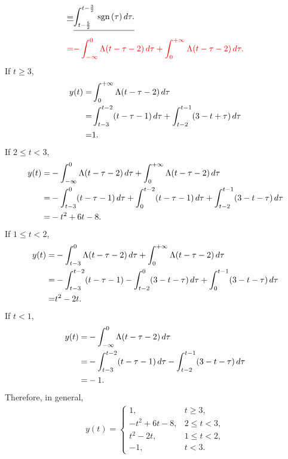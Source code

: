 \documentclass{assignment}
\begin{document}
\begin{sol}
\begin{itemize}
\begin{align}
            \notag\sout{=}&\sout{\int_{t-\frac{5}{2}}^{t-\frac{3}{2}}\sgn(\tau)\,d\tau.}\\
            {\color{red}=}&{\color{red}-\int_{-\infty}^0\Lambda(t-\tau-2)\,d\tau+\int_0^{+\infty}\Lambda(t-\tau-2)\,d\tau.}
        \end{align}
        {\color{red}
            If $t\geq 3$,
            \begin{align}
                \notag y(t)=&\int_0^{+\infty}\Lambda(t-\tau-2)\,d\tau\\
                \notag=&\int_{t-3}^{t-2}(t-\tau-1)\,d\tau+\int_{t-2}^{t-1}(3-t+\tau)\,d\tau\\
                =&1.
            \end{align}
            If $2\leq t<3$,
            \begin{align}
                \notag y(t)=&-\int_{-\infty}^0\Lambda(t-\tau-2)\,d\tau+\int_0^{+\infty}\Lambda(t-\tau-2)\,d\tau\\
                \notag=&-\int_{t-3}^0(t-\tau-1)\,d\tau+\int_0^{t-2}(t-\tau-1)\,d\tau+\int_{t-2}^{t-1}(3-t-\tau)\,d\tau\\
                =&-t^2+6t-8.
            \end{align}
            If $1\leq t<2$,
            \begin{align}
                \notag y(t)=&-\int_{t-3}^0\Lambda(t-\tau-2)\,d\tau+\int_0^{+\infty}\Lambda(t-\tau-2)\,d\tau\\
                \notag=&-\int_{t-3}^{t-2}(t-\tau-1)-\int_{t-2}^0(3-t-\tau)\,d\tau+\int_0^{t-1}(3-t-\tau)\,d\tau\\
                =&t^2-2t.
            \end{align}
            If $t<1$,
            \begin{align}
                \notag y(t)=&-\int_{-\infty}^0\Lambda(t-\tau-2)\,d\tau\\
                \notag=&-\int_{t-3}^{t-2}(t-\tau-1)\,d\tau-\int_{t-2}^{t-1}(3-t-\tau)\,d\tau\\
                =&-1.
            \end{align}
            Therefore, in general,
            \begin{align}
                y(t)=\left\{\begin{array}{ll}
                    1,&t\geq 3,\\
                    -t^2+6t-8,&2\leq t<3,\\
                    t^2-2t,&1\leq t<2,\\
                    -1,&t<3.
                \end{array}\right.
            \end{align}
        }
    \end{itemize}
\end{sol}
\end{document}
